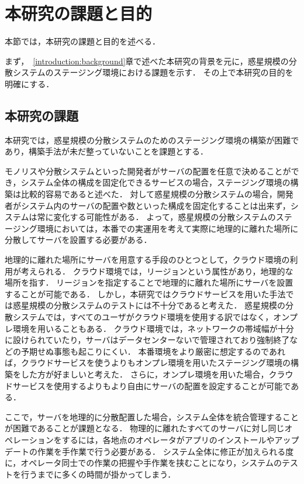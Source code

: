\section{本研究の課題と目的}
\label{introduction:issue-aim}

本節では，本研究の課題と目的を述べる．

まず，~\ref{introduction:background}章で述べた本研究の背景を元に，惑星規模の分散システムのステージング環境における課題を示す．
その上で本研究の目的を明確にする．

\subsection{本研究の課題}
\label{introduction:issue-aim:issue}

本研究では，惑星規模の分散システムのためのステージング環境の構築が困難であり，構築手法が未だ整っていないことを課題とする．

モノリスや分散システムといった開発者がサーバの配置を任意で決めることができ，システム全体の構成を固定化できるサービスの場合，ステージング環境の構築は比較的容易であると述べた．
対して惑星規模の分散システムの場合，開発者がシステム内のサーバの配置や数といった構成を固定化することは出来ず，システムは常に変化する可能性がある．
よって，惑星規模の分散システムのステージング環境においては，本番での実運用を考えて実際に地理的に離れた場所に分散してサーバを設置する必要がある．

地理的に離れた場所にサーバを用意する手段のひとつとして，クラウド環境の利用が考えられる．
クラウド環境では，リージョンという属性があり，地理的な場所を指す．
リージョンを指定することで地理的に離れた場所にサーバを設置することが可能である．
しかし，本研究ではクラウドサービスを用いた手法では惑星規模の分散システムのテストには不十分であると考えた．
惑星規模の分散システムでは，すべてのユーザがクラウド環境を使用する訳ではなく，オンプレ環境を用いることもある．
クラウド環境では，ネットワークの帯域幅が十分に設けられていたり，サーバはデータセンターないで管理されており強制終了などの予期せぬ事態も起こりにくい．
本番環境をより厳密に想定するのであれば，クラウドサービスを使うよりもオンプレ環境を用いたステージング環境の構築をした方が好ましいと考えた．
さらに，オンプレ環境を用いた場合，クラウドサービスを使用するよりもより自由にサーバの配置を設定することが可能である．

ここで，サーバを地理的に分散配置した場合，システム全体を統合管理することが困難であることが課題となる．
物理的に離れたすべてのサーバに対し同じオペレーションをするには，各地点のオペレータがアプリのインストールやアップデートの作業を手作業で行う必要がある．
システム全体に修正が加えられる度に，オペレータ同士での作業の把握や手作業を挟むことになり，システムのテストを行うまでに多くの時間が掛かってしまう．

